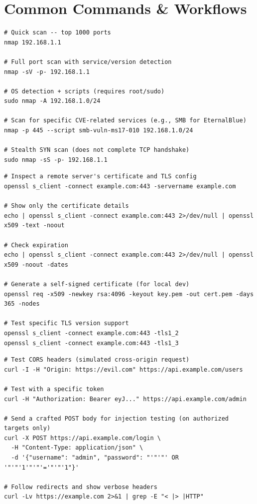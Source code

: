 \documentclass[11pt, letterpaper]{article}
\begin{document}
\section*{Common Commands \& Workflows}

\begin{lstlisting}[style=shell, caption={nmap: common scanning patterns}]
# Quick scan -- top 1000 ports
nmap 192.168.1.1

# Full port scan with service/version detection
nmap -sV -p- 192.168.1.1

# OS detection + scripts (requires root/sudo)
sudo nmap -A 192.168.1.0/24

# Scan for specific CVE-related services (e.g., SMB for EternalBlue)
nmap -p 445 --script smb-vuln-ms17-010 192.168.1.0/24

# Stealth SYN scan (does not complete TCP handshake)
sudo nmap -sS -p- 192.168.1.1
\end{lstlisting}

\begin{lstlisting}[style=shell, caption={openssl: certificate and TLS inspection}]
# Inspect a remote server's certificate and TLS config
openssl s_client -connect example.com:443 -servername example.com

# Show only the certificate details
echo | openssl s_client -connect example.com:443 2>/dev/null | openssl x509 -text -noout

# Check expiration
echo | openssl s_client -connect example.com:443 2>/dev/null | openssl x509 -noout -dates

# Generate a self-signed certificate (for local dev)
openssl req -x509 -newkey rsa:4096 -keyout key.pem -out cert.pem -days 365 -nodes

# Test specific TLS version support
openssl s_client -connect example.com:443 -tls1_2
openssl s_client -connect example.com:443 -tls1_3
\end{lstlisting}

\begin{lstlisting}[style=shell, caption={curl: API security testing}]
# Test CORS headers (simulated cross-origin request)
curl -I -H "Origin: https://evil.com" https://api.example.com/users

# Test with a specific token
curl -H "Authorization: Bearer eyJ..." https://api.example.com/admin

# Send a crafted POST body for injection testing (on authorized targets only)
curl -X POST https://api.example.com/login \
  -H "Content-Type: application/json" \
  -d '{"username": "admin", "password": "'"'"' OR '"'"'1'"'"'='"'"'1"}'

# Follow redirects and show verbose headers
curl -Lv https://example.com 2>&1 | grep -E "< |> |HTTP"
\end{lstlisting}
\end{document}

